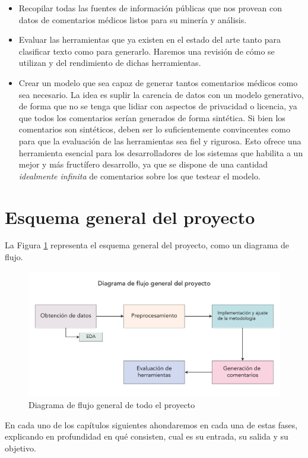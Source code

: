 \begin{itemize}
	\item Recopilar todas las fuentes de información públicas que nos provean con datos de comentarios médicos listos para su minería y análisis.
	\item Evaluar las herramientas que ya existen en el estado del arte tanto para clasificar texto como para generarlo. Haremos una revisión de cómo se utilizan y del rendimiento de dichas herramientas.
	\item Crear un modelo que sea capaz de generar tantos comentarios médicos como sea necesario. La idea es suplir la carencia de datos con un modelo generativo, de forma que no se tenga que lidiar con aspectos de privacidad o licencia, ya que todos los comentarios serían generados de forma sintética. Si bien los comentarios son sintéticos, deben ser lo suficientemente convincentes como para que la evaluación de las herramientas sea fiel y rigurosa. Esto ofrece una herramienta esencial para los desarrolladores de los sistemas que habilita a un mejor y más fructífero desarrollo, ya que se dispone de una cantidad \textit{idealmente infinita} de comentarios sobre los que testear el modelo.
\end{itemize}


\section{Esquema general del proyecto}

La Figura \ref{fig:general-diagram} representa el esquema general del proyecto, como un diagrama de flujo.
\begin{figure}[h]
	\centering
	\includegraphics[width=.9\textwidth]{media/general.pdf}
	\caption{Diagrama de flujo general de todo el proyecto}
	\label{fig:general-diagram}
\end{figure}

En cada uno de los capítulos siguientes ahondaremos en cada una de estas fases, explicando en profundidad en qué consisten, cual es su entrada, su salida y su objetivo.

